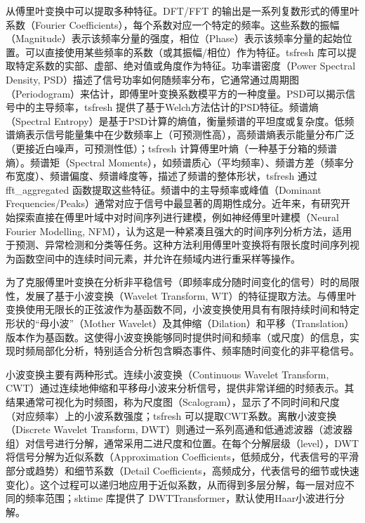 从傅里叶变换中可以提取多种特征。DFT/FFT 的输出是一系列复数形式的傅里叶系数（Fourier Coefficients），每个系数对应一个特定的频率。这些系数的振幅（Magnitude）表示该频率分量的强度，相位（Phase）表示该频率分量的起始位置。可以直接使用某些频率的系数（或其振幅/相位）作为特征。tsfresh 库可以提取特定系数的实部、虚部、绝对值或角度作为特征。功率谱密度（Power Spectral Density, PSD）描述了信号功率如何随频率分布，它通常通过周期图（Periodogram）来估计，即傅里叶变换系数模平方的一种度量。PSD可以揭示信号中的主导频率，tsfresh 提供了基于Welch方法估计的PSD特征。频谱熵（Spectral Entropy）是基于PSD计算的熵值，衡量频谱的平坦度或复杂度。低频谱熵表示信号能量集中在少数频率上（可预测性高），高频谱熵表示能量分布广泛（更接近白噪声，可预测性低）；tsfresh 计算傅里叶熵（一种基于分箱的频谱熵）。频谱矩（Spectral Moments），如频谱质心（平均频率）、频谱方差（频率分布宽度）、频谱偏度、频谱峰度等，描述了频谱的整体形状，tsfresh 通过 fft\_aggregated 函数提取这些特征。频谱中的主导频率或峰值（Dominant Frequencies/Peaks）通常对应于信号中最显著的周期性成分。近年来，有研究开始探索直接在傅里叶域中对时间序列进行建模，例如神经傅里叶建模（Neural Fourier Modelling, NFM），认为这是一种紧凑且强大的时间序列分析方法，适用于预测、异常检测和分类等任务。这种方法利用傅里叶变换将有限长度时间序列视为函数空间中的连续时间元素，并允许在频域内进行重采样等操作。

为了克服傅里叶变换在分析非平稳信号（即频率成分随时间变化的信号）时的局限性，发展了基于小波变换（Wavelet Transform, WT）的特征提取方法。与傅里叶变换使用无限长的正弦波作为基函数不同，小波变换使用具有有限持续时间和特定形状的“母小波”（Mother Wavelet）及其伸缩（Dilation）和平移（Translation）版本作为基函数。这使得小波变换能够同时提供时间和频率（或尺度）的信息，实现时频局部化分析，特别适合分析包含瞬态事件、频率随时间变化的非平稳信号。

小波变换\cite{rhif2019wavelet}主要有两种形式。连续小波变换（Continuous Wavelet Transform, CWT）通过连续地伸缩和平移母小波来分析信号，提供非常详细的时频表示。其结果通常可视化为时频图，称为尺度图（Scalogram），显示了不同时间和尺度（对应频率）上的小波系数强度；tsfresh 可以提取CWT系数。离散小波变换（Discrete Wavelet Transform, DWT）则通过一系列高通和低通滤波器（滤波器组）对信号进行分解，通常采用二进尺度和位置。在每个分解层级（level），DWT将信号分解为近似系数（Approximation Coefficients，低频成分，代表信号的平滑部分或趋势）和细节系数（Detail Coefficients，高频成分，代表信号的细节或快速变化）。这个过程可以递归地应用于近似系数，从而得到多层分解，每一层对应不同的频率范围；sktime 库\cite{loning2019sktime}提供了 DWTTransformer，默认使用Haar小波进行分解。


